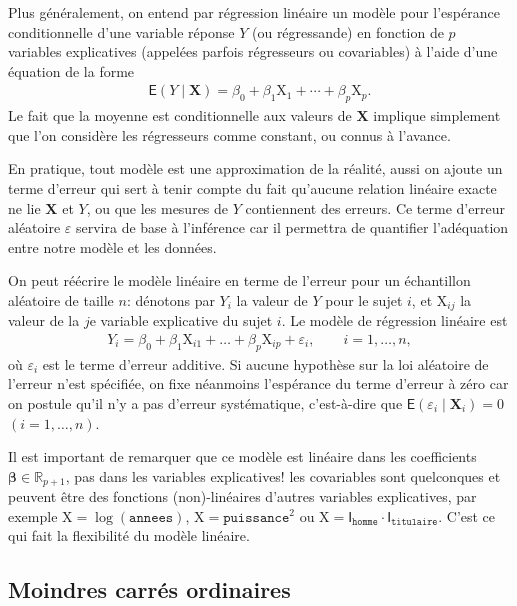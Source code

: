 \documentclass[
  11pt,
  letterpaper,
]{article}
\theoremstyle{definition}
\theoremstyle{definition}
\theoremstyle{definition}
\theoremstyle{remark}
\begin{document}
Plus généralement, on entend par régression linéaire un modèle pour l'espérance conditionnelle d'une variable réponse \(Y\) (ou régressande) en fonction de \(p\) variables explicatives (appelées parfois régresseurs ou covariables) à l'aide d'une équation de la forme
\begin{align*}
\mathsf{E}(Y \mid \mathbf{X})=\beta_0 + \beta_1\mathrm{X}_{1} + \cdots + \beta_p \mathrm{X}_{p}.
\end{align*}
Le fait que la moyenne est conditionnelle aux valeurs de \(\mathbf{X}\) implique simplement que l'on considère les régresseurs comme constant, ou connus à l'avance.

En pratique, tout modèle est une approximation de la réalité, aussi on ajoute un terme d'erreur qui sert à tenir compte du fait qu'aucune relation linéaire exacte ne lie \(\mathbf{X}\) et \(Y\), ou que les mesures de \(Y\) contiennent des erreurs. Ce terme d'erreur aléatoire \(\varepsilon\) servira de base à l'inférence car il permettra de quantifier l'adéquation entre notre modèle et les données.

On peut réécrire le modèle linéaire en terme de l'erreur pour un échantillon aléatoire de taille \(n\): dénotons par \(Y_i\) la valeur de \(Y\) pour le sujet \(i\), et \(\mathrm{X}_{ij}\) la valeur de la \(j\)e variable explicative du sujet \(i\). Le modèle de régression linéaire est
\begin{align}
Y_i = \beta_0 + \beta_1 \mathrm{X}_{i1} + \ldots + \beta_p \mathrm{X}_{ip} +\varepsilon_{i}, \qquad i =1, \ldots, n, \label{eq:olsmean}
\end{align}
où \(\varepsilon_i\) est le terme d'erreur additive. Si aucune hypothèse sur la loi aléatoire de l'erreur n'est spécifiée, on fixe néanmoins l'espérance du terme d'erreur à zéro car on postule qu'il n'y a pas d'erreur systématique, c'est-à-dire que \(\mathsf{E}(\varepsilon_i \mid \boldsymbol{X}_i)=0\) \((i=1, \ldots, n)\).

Il est important de remarquer que ce modèle est linéaire dans les coefficients \(\boldsymbol{\beta}\in \mathbb{R}_{p+1}\), pas dans les variables explicatives! les covariables sont quelconques et peuvent être des fonctions (non)-linéaires d'autres variables explicatives, par exemple \(\mathrm{X}=\log(\texttt{annees})\), \(\mathrm{X}=\texttt{puissance}^2\) ou \(\mathrm{X}= \mathsf{I}_{\texttt{homme}}\cdot\mathsf{I}_{\texttt{titulaire}}\). C'est ce qui fait la flexibilité du modèle linéaire.

\hypertarget{moindres-carruxe9s-ordinaires}{%
\subsection{Moindres carrés ordinaires}\label{moindres-carruxe9s-ordinaires}}
\end{document}
